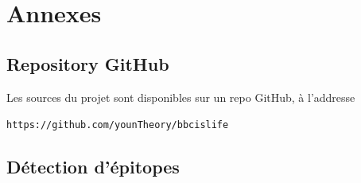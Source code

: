 \documentclass{article}
\begin{document}
  \newpage
  
  
  \nocite{*}

  \newpage
  \appendix
  \section{Annexes}
    \subsection{Repository GitHub}
      Les sources du projet sont disponibles sur un repo GitHub, à l'addresse \\
      {\centering
        \texttt{https://github.com/younTheory/bbcislife}
      \par}

    \subsection{Détection d'épitopes}
      \begin{figure}[h]%
        \centering
        \qquad
      \end{figure}
\end{document}
